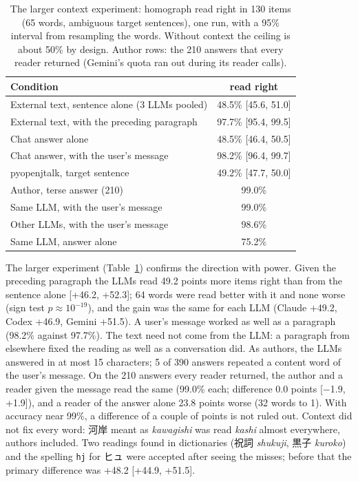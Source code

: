 \documentclass[11pt,a4paper]{article}
\newcommand{\ys}[1]{\mbox{\texttt{#1}}}
\begin{document}
\begin{table}[t]
\centering\small
\caption{The larger context experiment: homograph read right in 130 items (65 words, ambiguous target sentences), one
run, with a 95\% interval from resampling the words. Without context the ceiling is about 50\% by design. Author rows:
the 210 answers that every reader returned (Gemini's quota ran out during its reader calls).}
\label{tab:context}
\begin{tabular}{lc}
\toprule
Condition & read right\\
\midrule
External text, sentence alone (3 LLMs pooled) & 48.5\% [45.6, 51.0]\\
External text, with the preceding paragraph & 97.7\% [95.4, 99.5]\\
Chat answer alone & 48.5\% [46.4, 50.5]\\
Chat answer, with the user's message & 98.2\% [96.4, 99.7]\\
pyopenjtalk, target sentence & 49.2\% [47.7, 50.0]\\
\midrule
Author, terse answer (210) & 99.0\%\\
Same LLM, with the user's message & 99.0\%\\
Other LLMs, with the user's message & 98.6\%\\
Same LLM, answer alone & 75.2\%\\
\bottomrule
\end{tabular}
\end{table}

The larger experiment (Table~\ref{tab:context}) confirms the direction with power. Given the preceding paragraph the
LLMs read 49.2 points more items right than from the sentence alone [+46.2, +52.3]; 64 words were read better with it
and none worse (sign test $p \approx 10^{-19}$), and the gain was the same for each LLM (Claude +49.2, Codex +46.9,
Gemini +51.5). A user's message worked as well as a paragraph (98.2\% against 97.7\%). The text need not come from
the LLM: a paragraph from elsewhere fixed the reading as well as a conversation did. As authors, the LLMs answered in
at most 15 characters; 5 of 390 answers repeated a content word of the user's message. On the 210 answers every
reader returned, the author and a reader given the message read the same (99.0\% each; difference 0.0 points
[$-$1.9, +1.9]), and a reader of the answer alone 23.8 points worse (32 words to 1). With accuracy near 99\%, a
difference of a couple of points is not ruled out. Context did not fix every word: 河岸 meant as \emph{kawagishi}
was read \emph{kashi} almost everywhere, authors included. Two readings found in dictionaries (祝詞 \emph{shukuji},
黒子 \emph{kuroko}) and the spelling \ys{hj} for ヒュ were accepted after seeing the misses; before that the primary
difference was +48.2 [+44.9, +51.5].
\end{document}
